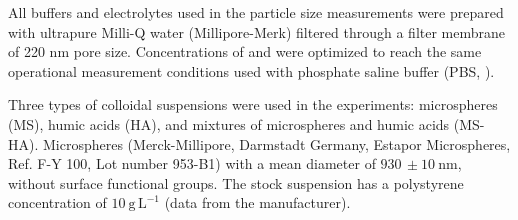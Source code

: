 \documentclass[journal=langd5,manuscript=article]{achemso}
\begin{document}



All buffers and electrolytes used in the particle size measurements were prepared with ultrapure Milli-Q water (Millipore-Merk)  filtered through a filter membrane of 220 nm pore size. Concentrations of  and  were optimized to reach the same operational measurement conditions used with phosphate saline buffer (PBS, ).


Three types of colloidal suspensions were used in the experiments: microspheres (MS), humic acids (HA), and mixtures of microspheres and humic acids (MS-HA).
Microspheres (Merck-Millipore, Darmstadt Germany, Estapor Microspheres, Ref. F-Y 100, Lot number 953-B1) with a mean diameter of $930 \, \pm 10~\mathrm{nm}$, without surface functional groups. The stock suspension has a polystyrene concentration of $10~\mathrm{g\,L^{-1}}$ (data from the manufacturer).
\end{document}
